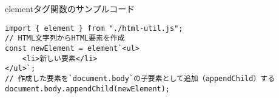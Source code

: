 \begin{listtitle}
elementタグ関数のサンプルコード
\end{listtitle}
\begin{lstlisting}
import { element } from "./html-util.js";
// HTML文字列からHTML要素を作成
const newElement = element`<ul>
    <li>新しい要素</li>
</ul>`;
// 作成した要素を`document.body`の子要素として追加（appendChild）する
document.body.appendChild(newElement);
\end{lstlisting}
\listend
